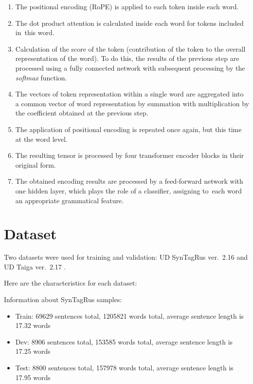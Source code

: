 \documentclass[11pt,twocolumn]{article}
\begin{document}
\begin{enumerate}
\item{
The positional encoding (RoPE) is applied to each token inside each word.
}
\item{
The dot product attention is calculated inside each word for tokens included in~this word.
}
\item{
Calculation of the score of the token (contribution of the token to the overall representation of the word). To do this, the results of the previous step are processed using a fully connected network with subsequent processing by the \textit{softmax} function.
}
\item{
The vectors of token representation within a single word are aggregated into a common vector of word representation by summation with multiplication by the coefficient obtained at the previous step.
}
\item{
The application of positional encoding is repeated once again, but this time at the word level.
}
\item{
The resulting tensor is processed by four transformer encoder blocks in their original form.
}
\item{
The obtained encoding results are processed by a feed-forward network with ~ one hidden layer, which plays the role of a classifier, assigning to~each word an appropriate grammatical feature.
}
\end{enumerate}

\section{Dataset}

  Two datasets were used for training and validation:
  UD SynTagRus ver.~2.16 \cite{Sintagrus} and
  UD Taiga ver.~2.17 \cite{Taiga}.

  Here are the characteristics for each dataset:

  Information about   SynTagRus samples:
  
  \begin{itemize}
 \item { 
Train:
69629 sentences  total,
1205821 words total,
average sentence length is  17.32 words
}
\item {
Dev:
 8906 sentences total,
153585 words total,
average sentence length is  17.25 words
}
\item {
Test:
 8800 sentences total,
157978 words total,
average sentence length is  17.95 words
}
\end{itemize}
\end{document}
